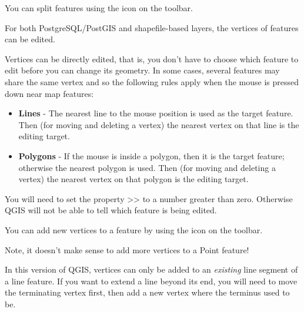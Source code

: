 
You can split features using the  icon
on the toolbar.


For both PostgreSQL/PostGIS and shapefile-based layers, the vertices of features can be edited. 

Vertices can be directly edited, that is, you don't
have to choose which feature to edit before you can change
its geometry.
In some cases, several features may share the same vertex
and so the following rules apply when the mouse is pressed
down near map features:

\begin{itemize}
\item \textbf{Lines}    - The nearest line to the mouse position
                          is used as the target feature.
                          Then (for moving and deleting a vertex)
                          the nearest vertex
                          on that line is the editing target.

\item \textbf{Polygons} - If the mouse is inside a polygon, then it is
                          the target feature; otherwise the nearest polygon
                          is used.
                          Then (for moving and deleting a vertex)
                          the nearest vertex
                          on that polygon is the editing target.
\end{itemize}

You will need to set the property
>>
to a number greater than zero.  Otherwise QGIS will not be able to tell which feature is being edited.



You can add new vertices to a feature by using the
 icon
on the toolbar.

Note, it doesn't make sense to add more vertices to a Point feature!

In this version of QGIS, vertices can only be added to an \textit{existing} line
segment of a line feature.  If you want to extend a line beyond its end,
you will need to move the terminating vertex first, then add a new vertex where
the terminus used to be.

